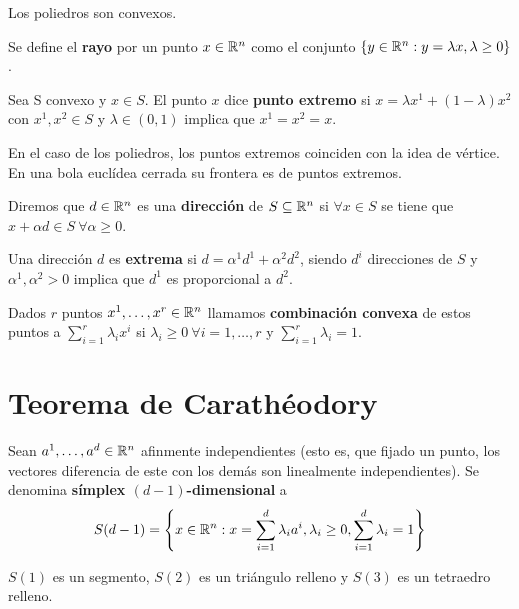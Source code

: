 \documentclass[PM.tex]{subfiles}
\begin{document}
\begin{coro}
Los poliedros son convexos.
\end{coro}

\begin{defi}
Se define el \textbf{rayo} por un punto $x\in\mathbb{R}^n$ como el conjunto $\left\{y\in\mathbb{R}^n: y=\lambda x, \lambda\geq 0\right\}$.
\end{defi}

\begin{defi}
Sea S convexo y $x\in S$. El punto $x$ dice \textbf{punto extremo} si $x=\lambda x^1 +(1-\lambda)x^2$ con $x^1,x^2\in S$ y $\lambda\in (0,1)$ implica que $x^1=x^2=x$.
\end{defi}
\begin{nota}  En el caso de los poliedros, los puntos extremos coinciden con la idea de vértice. En una bola euclídea cerrada su frontera es de puntos extremos.
\end{nota}

\begin{defi}
Diremos que $d\in\mathbb{R}^n$ es una \textbf{dirección} de $S\subseteq\mathbb{R}^n$ si $\forall x\in S$ se tiene que $x+\alpha d\in S\ \forall\alpha\geq 0$.
\end{defi}

\begin{defi} Una dirección $d$ es \textbf{extrema} si $d=\alpha^1d^1+\alpha^2d^2$, siendo $d^i$ direcciones de $S$ y $\alpha^1,\alpha^2>0$ implica que $d^1$ es proporcional a $d^2$.
\end{defi}

\begin{defi}
Dados $r$ puntos $x^1,\dots, x^r\in\mathbb{R}^n$ llamamos \textbf{combinación convexa} de estos puntos a $\sum_{i=1}^r\lambda_i x^i$ si $\lambda_i\geq 0\ \forall i=1,\dots, r$ y $\sum_{i=1}^r\lambda_i=1$.
\end{defi}

\section{Teorema de Carathéodory}
\begin{defi} Sean $a^1,\dots, a^d\in\mathbb{R}^n$ afinmente independientes (esto es, que fijado un punto, los vectores diferencia de este con los demás son linealmente independientes). Se denomina \textbf{símplex $(d-1)$-dimensional} a 
\[
S(d-1)= \left\{x\in\mathbb{R}^n:x=\sum_{i=1}^d\lambda_i a^i,\lambda_i\geq 0, \sum_{i=1}^d\lambda_i =1\right\}
\]
\end{defi}
\begin{example}
$S(1)$ es un segmento, $S(2)$ es un triángulo relleno y $S(3)$ es un tetraedro relleno.
\end{example}
\end{document}
